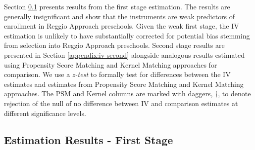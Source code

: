 Section \ref{appendix:iv-first} presents results from the first stage estimation. The results are generally insignificant and show that the instruments are weak predictors of enrollment in Reggio Approach preschools. Given the weak first stage, the IV estimation is unlikely to have substantially corrected for potential bias stemming from selection into Reggio Approach preschools. Second stage results are presented in Section \ref{appendix:iv-second} alongside analogous results estimated using Propensity Score Matching and Kernel Matching approaches for comparison. We use a \textit{z-test} to formally test for differences between the IV estimates and estimates from Propensity Score Matching and Kernel Matching approaches. The PSM and Kernel columns are marked with daggers, $\bm{\dagger}$, to denote rejection of the null of no difference between IV and comparison estimates at different significance levels.

\subsection{Estimation Results - First Stage}\label{appendix:iv-first}
\begin{table}[H]
\centering
{}
\end{table}



